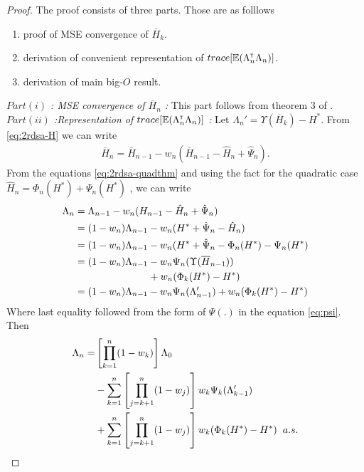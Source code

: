 \begin{proof}
The proof consists of three parts. Those are as folllows
\begin{enumerate}[]
  \item proof of MSE convergence of $\overline H_k$.
  \item derivation of convenient representation of $trace[\mathbb{E} (\Lambda_n ^\mathsf{\scriptscriptstyle T} \Lambda_n)]$.
  \item derivation of main big-$O$ result.
\end{enumerate}
\emph{$Part(i)$ : MSE convergence of $\overline H_n$ :} This part follows from theorem 3 of \cite{spall-jacobian} .\\
\emph{$Part(ii)$ :Representation of $trace[\mathbb{E} (\Lambda_n ^\mathsf{\scriptscriptstyle T} \Lambda_n)]$ :} Let $\Lambda_n' = \Upsilon(\overline H_k) - H^*$. From \eqref{eq:2rdsa-H} we can write
\begin{align}\label{eq:2rdsa-quadthm}
\overline H_n = \overline H_{n-1} - w_n (\overline H_{n-1} - \hat H_n + \hat \Psi_n).
\end{align}
 From the equations \eqref{eq:2rdsa-quadthm} and using the fact for the quadratic case $\hat H_n = \Phi_n(H^*) + \Psi_n(H^*)$ ,  we can write 
 \begin{align}\label{eq:lambdak}
 \Lambda_n &= \Lambda_{n-1} - w_n ( H_{n-1} - \hat H_n + \hat \Psi_n) \nonumber\\&= (1-w_n) \Lambda_{n-1} - w_n (H^* + \hat \Psi_n - \hat H_n ) \nonumber\\&= (1-w_n) \Lambda_{n-1} - w_n (H^*+\hat \Psi_n -\Phi_n(H^*) - \Psi_n(H^*)\nonumber\\&= (1-w_n) \Lambda_{n-1} - w_n \Psi_n(\Upsilon(\overline H_{n-1})) \nonumber\\& \hspace{2.6cm}+ w_n (\Phi_k(H^*) - H^*)\nonumber\\&= (1-w_n) \Lambda_{n-1} - w_n\Psi_n(\Lambda_{n-1}')+ w_n (\Phi_k(H^*) - H^*)
 \end{align}
 Where last equality followed from the form of $\Psi(.)$ in the equation \eqref{eq:psi}. Then
 \begin{align}\label{lambda-exp}
 \Lambda_n  = & \left[ \prod_{k=1}^n (1-w_k) \right]\Lambda_0 \nonumber\\ &- \sum_{k=1}^n \left[\prod_{j=k+1}^n (1-w_j)\right] w_k \Psi_k(\Lambda_{k-1}') \nonumber\\ &+ \sum_{k=1}^n \left[\prod_{j=k+1}^n (1-w_j)\right] w_k (\Phi_k(H^*) - H^*) \hspace{0.2cm} a.s.
 \end{align}

\end{proof}
